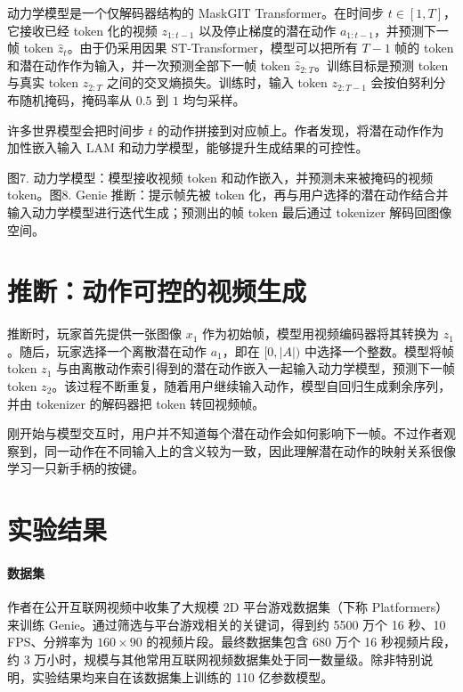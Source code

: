 \documentclass[10pt]{article}
\begin{document}
动力学模型是一个仅解码器结构的 MaskGIT Transformer。在时间步 $t\in[1,T]$，它接收已经 token 化的视频 $z_{1:t-1}$ 以及停止梯度的潜在动作 $a_{1:t-1}$，并预测下一帧 token $\hat z_t$。由于仍采用因果 ST-Transformer，模型可以把所有 $T-1$ 帧的 token 和潜在动作作为输入，并一次预测全部下一帧 token $\hat z_{2:T}$。训练目标是预测 token 与真实 token $z_{2:T}$ 之间的交叉熵损失。训练时，输入 token $z_{2:T-1}$ 会按伯努利分布随机掩码，掩码率从 $0.5$ 到 $1$ 均匀采样。

许多世界模型会把时间步 $t$ 的动作拼接到对应帧上。作者发现，将潜在动作作为加性嵌入输入 LAM 和动力学模型，能够提升生成结果的可控性。

图7. 动力学模型：模型接收视频 token 和动作嵌入，并预测未来被掩码的视频 token。图8. Genie 推断：提示帧先被 token 化，再与用户选择的潜在动作结合并输入动力学模型进行迭代生成；预测出的帧 token 最后通过 tokenizer 解码回图像空间。

\section*{推断：动作可控的视频生成}

推断时，玩家首先提供一张图像 $x_1$ 作为初始帧，模型用视频编码器将其转换为 $z_1$。随后，玩家选择一个离散潜在动作 $a_1$，即在 $[0, |A|)$ 中选择一个整数。模型将帧 token $z_1$ 与由离散动作索引得到的潜在动作嵌入一起输入动力学模型，预测下一帧 token $z_2$。该过程不断重复，随着用户继续输入动作，模型自回归生成剩余序列，并由 tokenizer 的解码器把 token 转回视频帧。

刚开始与模型交互时，用户并不知道每个潜在动作会如何影响下一帧。不过作者观察到，同一动作在不同输入上的含义较为一致，因此理解潜在动作的映射关系很像学习一只新手柄的按键。

\section{实验结果}

\paragraph{数据集}

作者在公开互联网视频中收集了大规模 2D 平台游戏数据集（下称 Platformers）来训练 Genie。通过筛选与平台游戏相关的关键词，得到约 5500 万个 16 秒、10 FPS、分辨率为 $160\times90$ 的视频片段。最终数据集包含 680 万个 16 秒视频片段，约 3 万小时，规模与其他常用互联网视频数据集处于同一数量级。除非特别说明，实验结果均来自在该数据集上训练的 110 亿参数模型。
\end{document}
